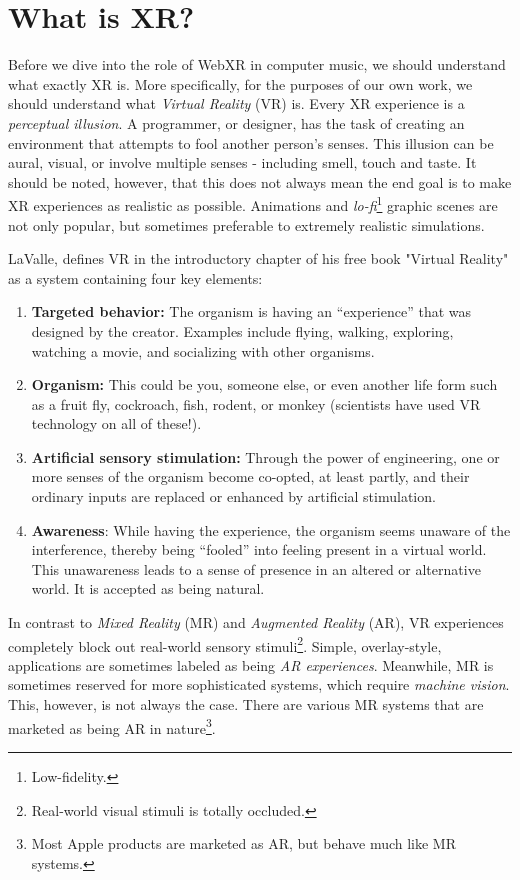 \section{What is XR?}

Before we dive into the role of WebXR in computer music, we should understand what exactly XR is. More specifically, for the purposes of our own work, we should understand what \textit{Virtual Reality} (VR) is. Every XR experience is a \textit{perceptual illusion}. A programmer, or designer, has the task of creating an environment that attempts to fool another person's senses. This illusion can be aural, visual, or involve multiple senses - including smell, touch and taste. It should be noted, however, that this does not always mean the end goal is to make XR experiences as realistic as possible. Animations and \textit{lo-fi}\footnote{Low-fidelity.} graphic scenes are not only popular, but sometimes preferable to extremely realistic simulations.

LaValle, defines VR in the introductory chapter of his free book "Virtual Reality" \cite{lavalle2016virtual} as a system containing four key elements:

\begin{enumerate}
    \item \textbf{Targeted behavior:} The organism is having an “experience” that was designed by the creator. Examples include flying, walking, exploring, watching a movie, and socializing with other organisms.
    \item \textbf{Organism:} This could be you, someone else, or even another life form such as a fruit fly, cockroach, fish, rodent, or monkey (scientists have used VR technology on all of these!).
    \item \textbf{Artificial sensory stimulation:} Through the power of engineering, one or more senses of the organism become co-opted, at least partly, and their ordinary inputs are replaced or enhanced by artificial stimulation.
    \item \textbf{Awareness}: While having the experience, the organism seems unaware of the interference, thereby being “fooled” into feeling present in a virtual world. This unawareness leads to a sense of presence in an altered or alternative world. It is accepted as being natural.
\end{enumerate}

In contrast to \textit{Mixed Reality} (MR) and \textit{Augmented Reality} (AR), VR experiences completely block out real-world sensory stimuli\footnote{Real-world visual stimuli is totally occluded.}. Simple, overlay-style, applications are sometimes labeled as being \textit{AR experiences}. Meanwhile, MR is sometimes reserved for more sophisticated systems, which require \textit{machine vision}. This, however, is not always the case. There are various MR systems that are marketed as being AR in nature\footnote{Most Apple products are marketed as AR, but behave much like MR systems.}. 

